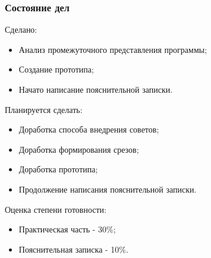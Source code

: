 \documentclass{beamer}
\begin{document}
	\begin{frame}
		\frametitle{Состояние дел}
        Сделано:
		\begin{itemize}
            \item Анализ промежуточного представления программы;
            \item Создание прототипа;
            \item Начато написание пояснительной записки.
        \end{itemize}

        Планируется сделать:
        \begin{itemize}
            \item Доработка способа внедрения советов;
            \item Доработка формирования срезов;
            \item Доработка прототипа;
            \item Продолжение написания пояснительной записки.
        \end{itemize}
        Оценка степени готовности:
        \begin{itemize}
            \item Практическая часть - 30\%;
            \item Пояснительная записка - 10\%.
        \end{itemize}
    \end{frame}
\end{document}
